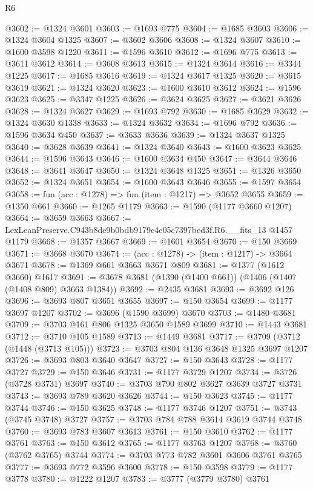 \begin{lexlean}{R6}
\begin{coremodule}
@3602 := @1324 @3601
@3603 := @1693 @775
@3604 := @1685 @3603
@3606 := @1324 @3604 @1325
@3607 := @3602 @3606
@3608 := @1324 @3607
@3610 := @1600 @3598 @1220
@3611 := @1596 @3610
@3612 := @1696 @775
@3613 := @3611 @3612
@3614 := @3608 @3613
@3615 := @1324 @3614
@3616 := @3344 @1225
@3617 := @1685 @3616
@3619 := @1324 @3617 @1325
@3620 := @3615 @3619
@3621 := @1324 @3620
@3623 := @1600 @3610 @3612
@3624 := @1596 @3623
@3625 := @3347 @1225
@3626 := @3624 @3625
@3627 := @3621 @3626
@3628 := @1324 @3627
@3629 := @1693 @792
@3630 := @1685 @3629
@3632 := @1324 @3630 @1338
@3633 := @1324 @3632
@3634 := @1696 @792
@3636 := @1596 @3634 @450
@3637 := @3633 @3636
@3639 := @1324 @3637 @1325
@3640 := @3628 @3639
@3641 := @1324 @3640
@3643 := @1600 @3623 @3625
@3644 := @1596 @3643
@3646 := @1600 @3634 @450
@3647 := @3644 @3646
@3648 := @3641 @3647
@3650 := @1324 @3648 @1325
@3651 := @1326 @3650
@3652 := @1324 @3651
@3654 := @1600 @3643 @3646
@3655 := @1597 @3654
@3658 := fun (acc : @1278) => fun (item : @1217) => @3652 @3655
@3659 := @1350 @661
@3660 := @1265 @1179
@3663 := @1590 (@1177 @3660 @1207)
@3664 := @3659 @3663
@3667 := LexLeanPreserve.C943b8de9b0bdb9179c4e05c7397bed3f.R6.__fits_13 @1457 @1179
@3668 := @1357 @3667
@3669 := @1601 @3654
@3670 := @150 @3669
@3671 := @3668 @3670
@3674 := (acc : @1278) -> (item : @1217) -> @3664 @3671
@3678 := @1369 @661 @3663 @3671 @809
@3681 := @1377 (@1612 @3660) @1617
@3691 := @3678 @3681 (@1390 (@1400 @661)) (@1406 (@1407 (@1408 @809) @3663 @1384))
@3692 := @2435 @3681
@3693 := @3692 @126
@3696 := @3693 @807 @3651 @3655
@3697 := @150 @3654
@3699 := @1177 @3697 @1207
@3702 := @3696 (@1590 @3699) @3670
@3703 := @1480 @3681
@3709 := @3703 @161 @806 @1325 @3650 @1589 @3699
@3710 := @1443 @3681
@3712 := @3710 @105 @1589
@3713 := @1449 @3681
@3717 := @3709 (@3712 (@1448 (@3713 @105)))
@3723 := @3703 @804 @136 @3648 @1325 @3697 @1207
@3726 := @3693 @803 @3640 @3647
@3727 := @150 @3643
@3728 := @1177 @3727
@3729 := @150 @3646
@3731 := @1177 @3729 @1207
@3734 := @3726 (@3728 @3731) @3697
@3740 := @3703 @790 @802 @3627 @3639 @3727 @3731
@3743 := @3693 @789 @3620 @3626
@3744 := @150 @3623
@3745 := @1177 @3744
@3746 := @150 @3625
@3748 := @1177 @3746 @1207
@3751 := @3743 (@3745 @3748) @3727
@3757 := @3703 @784 @788 @3614 @3619 @3744 @3748
@3760 := @3693 @783 @3607 @3613
@3761 := @150 @3610
@3762 := @1177 @3761
@3763 := @150 @3612
@3765 := @1177 @3763 @1207
@3768 := @3760 (@3762 @3765) @3744
@3774 := @3703 @773 @782 @3601 @3606 @3761 @3765
@3777 := @3693 @772 @3596 @3600
@3778 := @150 @3598
@3779 := @1177 @3778
@3780 := @1222 @1207
@3783 := @3777 (@3779 @3780) @3761

\end{coremodule}
\end{lexlean}
